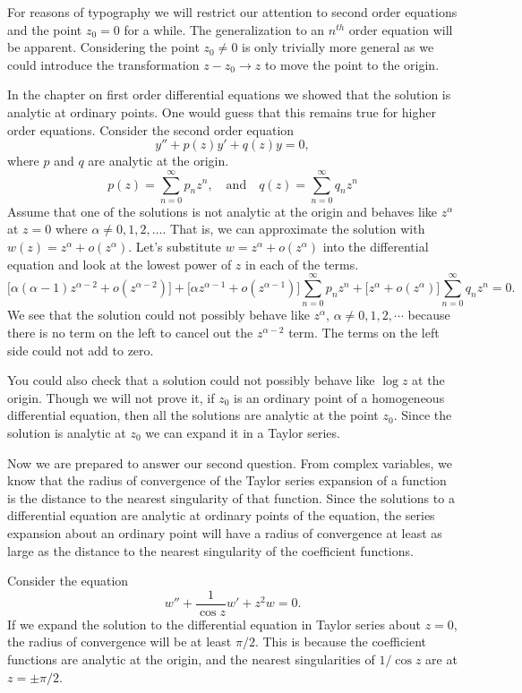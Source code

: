 For reasons of typography we will restrict our attention to second
order equations and the point $z_0 = 0$ for a while.  The generalization to an 
$n^{t h}$ order equation will be apparent.  Considering the point
$z_0 \neq 0$ is only trivially more general as we could introduce 
the transformation $z-z_0 \to z$ to move the point to the origin.

In the chapter on first order differential equations we showed that the 
solution is analytic at ordinary points.  One would guess that this remains
true for higher order equations.  Consider the second order equation
\[ y'' + p(z) y' + q(z) y = 0, \]
where $p$ and $q$ are analytic at the origin.
\[ p(z) = \sum_{n=0}^\infty p_n z^n, \quad \mathrm{and} \quad 
q(z) = \sum_{n=0}^\infty q_n z^n \]
Assume that one of the solutions is not analytic at the origin and 
behaves like $z^\alpha$ at $z=0$ where
$\alpha \neq 0, 1, 2, \ldots$.  That is, we can approximate the solution with
$w(z) = z^\alpha + o(z^\alpha)$.  
Let's substitute $w = z^\alpha + o(z^\alpha)$ into the differential equation
and look at the lowest power of $z$ in each of the terms.
\[ \big[ \alpha(\alpha-1)z^{\alpha-2} + o(z^{\alpha-2}) \big] 
+  \big[\alpha z^{\alpha-1} + o(z^{\alpha-1}) \big] \sum_{n=0}^\infty p_n z^n
+ \big[ z^\alpha + o(z^\alpha) \big] \sum_{n=0}^\infty q_n z^n = 0. \]
We see that the solution could not possibly behave like $z^\alpha$, 
$\alpha \neq 0, 1, 2, \cdots$ because there is no term on the left
to cancel out the $z^{\alpha-2}$ term.  The terms on the left side
could not add to zero.  

You could also check that a solution could not possibly behave like
$\log z$ at the origin. Though we will not prove it, 
if $z_0$ is an ordinary point of a homogeneous differential equation, then
all the solutions are analytic at the point $z_0$.
Since the solution is analytic at $z_0$ we can expand it in a Taylor series.




Now we are prepared to answer our second question.
From complex variables, we know that
the radius of convergence of the Taylor series expansion of a function
is the distance to the nearest singularity of that function.
Since the solutions to a differential equation are analytic at ordinary 
points of the equation, the series expansion about an ordinary point
will have a radius of convergence at least as large as the distance to the
nearest singularity of the coefficient functions.


\begin{Example}
  Consider the equation
  \[ w'' + \frac{1}{\cos z} w' + z^2 w = 0. \]
  If we expand the solution to the differential equation in Taylor series
  about $z = 0$, the radius of convergence will be at least $\pi/2$.
  This is because the coefficient functions are analytic at the origin, and
  the nearest singularities of $1/\cos z$ are at $z = \pm \pi/2$.
\end{Example}




